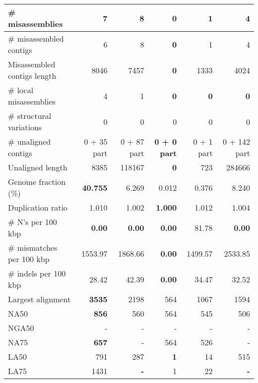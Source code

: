 \documentclass[12pt,a4paper]{article}
\begin{document}
\begin{table}[ht]
\begin{center}
\begin{tabular}{|l*{5}{|r}|}
\# misassemblies & 7 & 8 & {\bf 0} & 1 & 4 \\ \hline
\# misassembled contigs & 6 & 8 & {\bf 0} & 1 & 4 \\ \hline
Misassembled contigs length & 8046 & 7457 & {\bf 0} & 1333 & 4024 \\ \hline
\# local misassemblies & 4 & 1 & {\bf 0} & {\bf 0} & {\bf 0} \\ \hline
\# structural variations & 0 & 0 & 0 & 0 & 0 \\ \hline
\# unaligned contigs & 0 + 35 part & 0 + 87 part & {\bf 0 + 0 part} & 0 + 1 part & 0 + 142 part \\ \hline
Unaligned length & 8385 & 118167 & {\bf 0} & 723 & 284666 \\ \hline
Genome fraction (\%) & {\bf 40.755} & 6.269 & 0.012 & 0.376 & 8.240 \\ \hline
Duplication ratio & 1.010 & 1.002 & {\bf 1.000} & 1.012 & 1.004 \\ \hline
\# N's per 100 kbp & {\bf 0.00} & {\bf 0.00} & {\bf 0.00} & 81.78 & {\bf 0.00} \\ \hline
\# mismatches per 100 kbp & 1553.97 & 1868.66 & {\bf 0.00} & 1499.57 & 2533.85 \\ \hline
\# indels per 100 kbp & 28.42 & 42.39 & {\bf 0.00} & 34.47 & 32.52 \\ \hline
Largest alignment & {\bf 3535} & 2198 & 564 & 1067 & 1594 \\ \hline
NA50 & {\bf 856} & 560 & 564 & 545 & 506 \\ \hline
NGA50 & - & - & - & - & - \\ \hline
NA75 & {\bf 657} & - & 564 & 526 & - \\ \hline
LA50 & 791 & 287 & {\bf 1} & 14 & 515 \\ \hline
LA75 & 1431 & {\bf -} & 1 & 22 & {\bf -} \\ \hline
\end{tabular}
\end{center}
\end{table}
\end{document}
